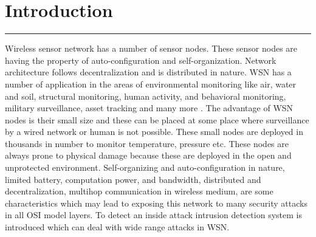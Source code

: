 \chapter{Introduction}
\label{C1} %
\graphicspath{{Figures/PDF/}{Figures/PNG/}}
\noindent\rule{\linewidth}{2pt}

\noindent Wireless sensor network has a number of sensor nodes. These sensor nodes are having the property of auto-configuration and self-organization. Network architecture follows decentralization and is distributed in nature. WSN has a number of application in the areas of environmental monitoring like air, water and soil, structural monitoring, human activity, and behavioral monitoring, military surveillance, asset tracking and many more \cite{akyildiz2002wireless}. The advantage of WSN nodes is their small size and these can be placed at some place where surveillance by a wired network or human is not possible. These small nodes are deployed in thousands in number to monitor temperature, pressure etc. These nodes are always prone to physical damage because these are deployed in the open and unprotected environment. Self-organizing and auto-configuration in nature, limited battery, computation power, and bandwidth, distributed and decentralization, multihop communication in wireless medium, are some characteristics which may lead to exposing this network to many security attacks in all OSI model layers. 
To detect an inside attack intrusion detection system is introduced which can deal with wide range attacks in WSN.
\par
